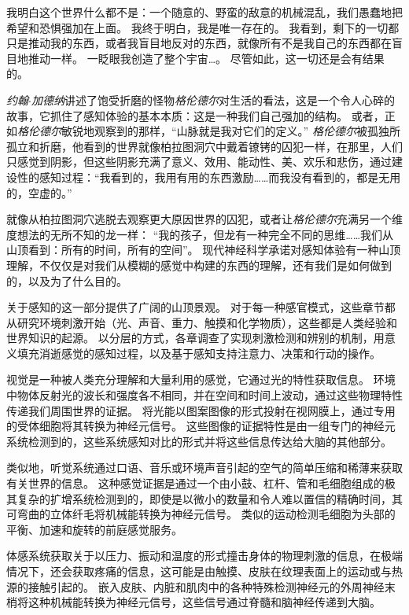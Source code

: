 我明白这个世界什么都不是：一个随意的、野蛮的敌意的机械混乱，我们愚蠢地把希望和恐惧强加在上面。
我终于明白，我是唯一存在的。
我看到，剩下的一切都只是推动我的东西，或者我盲目地反对的东西，就像所有不是我自己的东西都在盲目地推动一样。
一眨眼我创造了整个宇宙…。
尽管如此，这一切还是会有结果的。


\textit{约翰$\cdot$加德纳}讲述了饱受折磨的怪物\textit{格伦德尔}对生活的看法，这是一个令人心碎的故事，它抓住了感知体验的基本本质：这是一种我们自己强加的结构。
或者，正如\textit{格伦德尔}敏锐地观察到的那样，“山脉就是我对它们的定义。”
\textit{格伦德尔}被孤独所孤立和折磨，他看到的世界就像柏拉图洞穴中戴着镣铐的囚犯一样，在那里，人们只感觉到阴影，但这些阴影充满了意义、效用、能动性、美、欢乐和悲伤，通过建设性的感知过程：“我看到的，我用有用的东西激励……而我没有看到的，都是无用的，空虚的。”


就像从柏拉图洞穴逃脱去观察更大原因世界的囚犯，或者让\textit{格伦德尔}充满另一个维度想法的无所不知的龙一样：
“我的孩子，但龙有一种完全不同的思维……我们从山顶看到：所有的时间，所有的空间”。
现代神经科学承诺对感知体验有一种山顶理解，不仅仅是对我们从模糊的感觉中构建的东西的理解，还有我们是如何做到的，以及为了什么目的。


关于感知的这一部分提供了广阔的山顶景观。
对于每一种感官模式，这些章节都从研究环境刺激开始（光、声音、重力、触摸和化学物质），这些都是人类经验和世界知识的起源。
以分层的方式，各章调查了实现刺激检测和辨别的机制，用意义填充消逝感觉的感知过程，以及基于感知支持注意力、决策和行动的操作。


视觉是一种被人类充分理解和大量利用的感觉，它通过光的特性获取信息。
环境中物体反射光的波长和强度各不相同，并在空间和时间上波动，通过这些物理特性传递我们周围世界的证据。
将光能以图案图像的形式投射在视网膜上，通过专用的受体细胞将其转换为神经元信号。
这些图像的证据特性是由一组专门的神经元系统检测到的，这些系统感知对比的形式并将这些信息传达给大脑的其他部分。


类似地，听觉系统通过口语、音乐或环境声音引起的空气的简单压缩和稀薄来获取有关世界的信息。
这种感觉证据是通过一个由小鼓、杠杆、管和毛细胞组成的极其复杂的扩增系统检测到的，即使是以微小的数量和令人难以置信的精确时间，其可弯曲的立体纤毛将机械能转换为神经元信号。
类似的运动检测毛细胞为头部的平衡、加速和旋转的前庭感觉服务。


体感系统获取关于以压力、振动和温度的形式撞击身体的物理刺激的信息，在极端情况下，还会获取疼痛的信息，这可能是由触摸、皮肤在纹理表面上的运动或与热源的接触引起的。
嵌入皮肤、内脏和肌肉中的各种特殊检测神经元的外周神经末梢将这种机械能转换为神经元信号，这些信号通过脊髓和脑神经传递到大脑。


